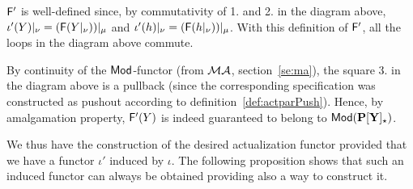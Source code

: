 ${\sf {F'}}$ is well-defined since, by commutativity of 1. and 2. in the diagram
above, $\iota'(Y)|_{\nu} =
({\sf {F}}(Y|_\nu))|_{\mu}$ and $\iota'(h)|_{\nu} = ({\sf {F}}(h|_\nu))|_{\mu}$.
With this definition of ${\sf {F}}'$, all the loops
in the diagram  above commute. 
%

By continuity of the ${\sf {Mod}}$-functor (from ${\mathcal{MA}}$, section~\ref{se:ma}),
the square 3. in the diagram above is a pullback
(since the corresponding specification was constructed as pushout
according to definition~\ref{def:actparPush}). Hence, by amalgamation
property, ${\sf {F}}'(Y)$ is indeed guaranteed to belong to
${\sf {Mod}}({\bf P[Y]_\star})$. 

We thus have the construction of the desired actualization functor provided
that we have a functor $\iota'$ induced by $\iota$. The following proposition
shows that such an induced functor can always be obtained providing also a
way to construct it.

